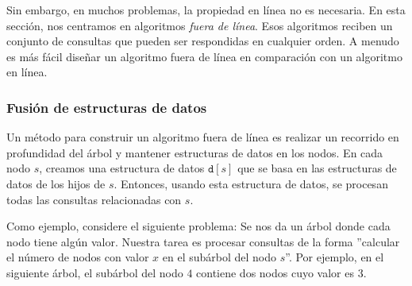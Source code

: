 Sin embargo, en muchos problemas, la propiedad en línea
no es necesaria.
En esta sección, nos centramos en algoritmos \emph{fuera de línea}.
Esos algoritmos reciben un conjunto de consultas que pueden
ser respondidas en cualquier orden.
A menudo es más fácil diseñar un algoritmo fuera de línea
en comparación con un algoritmo en línea.

\subsubsection{Fusión de estructuras de datos}

Un método para construir un algoritmo fuera de línea
es realizar un recorrido en profundidad del árbol
y mantener estructuras de datos en los nodos.
En cada nodo $s$, creamos una estructura de datos
$\texttt{d}[s]$ que se basa en las
estructuras de datos de los hijos de $s$.
Entonces, usando esta estructura de datos,
se procesan todas las consultas relacionadas con $s$.


Como ejemplo, considere el siguiente problema:
Se nos da un árbol donde cada nodo tiene algún valor.
Nuestra tarea es procesar consultas de la forma
''calcular el número de nodos con valor $x$
en el subárbol del nodo $s$''.
Por ejemplo, en el siguiente árbol,
el subárbol del nodo $4$ contiene dos nodos
cuyo valor es 3.

\begin{center}
\end{center}

